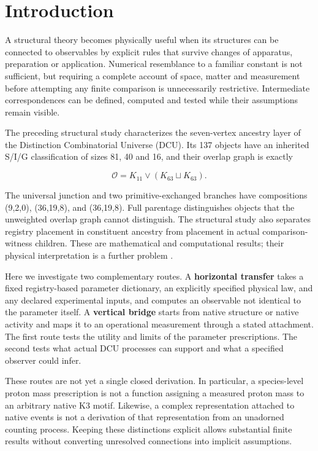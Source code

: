 \documentclass[11pt,a4paper]{article}
\begin{document}
\section{Introduction}\label{introduction}

A structural theory becomes physically useful when its structures can be connected to observables by explicit rules that survive changes of apparatus, preparation or application. Numerical resemblance to a familiar constant is not sufficient, but requiring a complete account of space, matter and measurement before attempting any finite comparison is unnecessarily restrictive. Intermediate correspondences can be defined, computed and tested while their assumptions remain visible.

The preceding structural study characterizes the seven-vertex ancestry layer of the Distinction Combinatorial Universe (DCU). Its 137 objects have an inherited S/I/G classification of sizes 81, 40 and 16, and their overlap graph is exactly

\begin{equation}\label{eq:1}
\mathcal O=K_{11}\vee(K_{63}\sqcup K_{63}).
\end{equation}

The universal junction and two primitive-exchanged branches have compositions (9,2,0), (36,19,8), and (36,19,8). Full parentage distinguishes objects that the unweighted overlap graph cannot distinguish. The structural study also separates registry placement in constituent ancestry from placement in actual comparison-witness children. These are mathematical and computational results; their physical interpretation is a further problem \cite{D1}.

Here we investigate two complementary routes. A \textbf{horizontal transfer} takes a fixed registry-based parameter dictionary, an explicitly specified physical law, and any declared experimental inputs, and computes an observable not identical to the parameter itself. A \textbf{vertical bridge} starts from native structure or native activity and maps it to an operational measurement through a stated attachment. The first route tests the utility and limits of the parameter prescriptions. The second tests what actual DCU processes can support and what a specified observer could infer.

These routes are not yet a single closed derivation. In particular, a species-level proton mass prescription is not a function assigning a measured proton mass to an arbitrary native K3 motif. Likewise, a complex representation attached to native events is not a derivation of that representation from an unadorned counting process. Keeping these distinctions explicit allows substantial finite results without converting unresolved connections into implicit assumptions.
\end{document}
